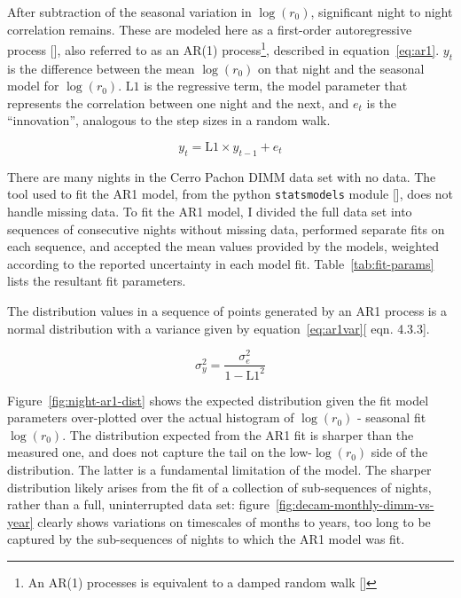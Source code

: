 \documentclass[DM,authoryear,toc]{lsstdoc}
\begin{document}
After subtraction of the seasonal variation in $\log(r_0)$,
significant night to night correlation remains. These are modeled here as a
first-order autoregressive process [\cite{cryer_time_2008}], also
referred to as an AR(1) process\footnote{An AR(1) processes is equivalent to a damped random walk
[\cite{2009ApJ...698..895K}]}, described in
equation~\ref{eq:ar1}. $y_t$ is the difference between the mean
$\log(r_0)$ on that night and the seasonal model for
$\log(r_0)$. $\mbox{L1}$ is the regressive term, the model parameter
that represents the correlation between one night and the next, and
$e_t$ is the ``innovation'', analogous to the step sizes in a random
walk.

\begin{equation} \label{eq:ar1}
y_t = \mbox{L1} \times y_{t-1} + e_t
\end{equation}

There are many nights in the Cerro Pachon DIMM data set with no data.
The tool used to fit the AR1 model, from the python
\texttt{statsmodels} module [\cite{seabold2010statsmodels}], does not
handle missing data. To fit the AR1 model, I divided the full data set
into sequences of consecutive nights without missing data, performed
separate fits on each sequence, and accepted the mean values provided
by the models, weighted according to the reported uncertainty in each
model fit. Table~\ref{tab:fit-params} lists the resultant fit
parameters.

The distribution values in a sequence of points generated by an AR1
process is a normal distribution with a variance given by
equation~\ref{eq:ar1var}[\cite{cryer_time_2008} eqn. 4.3.3].

\begin{equation} \label{eq:ar1var}
\sigma_y^2 = \frac{\sigma_e^2}{1-\mbox{L1}^2}
\end{equation}

Figure~\ref{fig:night-ar1-dist} shows the expected distribution given
the fit model parameters over-plotted over the actual histogram of
$\log(r_0)$ - seasonal fit $\log(r_0)$. The distribution expected from
the AR1 fit is sharper than the measured one, and does not capture the
tail on the low-$\log(r_0)$ side of the distribution. The latter is a
fundamental limitation of the model. The sharper distribution likely
arises from the fit of a collection of sub-sequences of nights, rather
than a full, uninterrupted data set:
figure~\ref{fig:decam-monthly-dimm-vs-year} clearly shows variations on
timescales of months to years, too long to be captured by the
sub-sequences of nights to which the AR1 model was fit.
\end{document}
